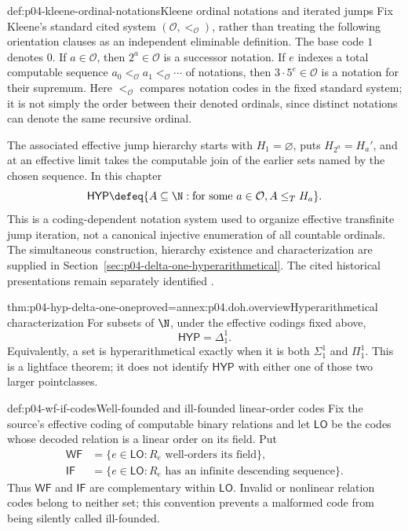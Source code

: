 \begin{hbmethod}{def:p04-kleene-ordinal-notations}{Kleene ordinal notations and iterated jumps}
Fix Kleene's standard cited system \((\mathcal O,<_{\mathcal O})\), rather
than treating the following orientation clauses as an independent eliminable
definition.  The base code \(1\) denotes \(0\).  If \(a\in\mathcal O\), then
\(2^a\in\mathcal O\) is a successor notation.  If \(e\) indexes a total
computable sequence \(a_0<_{\mathcal O}a_1<_{\mathcal O}\cdots\) of notations,
then \(3\cdot5^e\in\mathcal O\) is a notation for their supremum.
Here \(<_{\mathcal O}\) compares notation codes in the fixed standard system;
it is not simply the order between their denoted ordinals, since distinct
notations can denote the same recursive ordinal.

The associated effective jump hierarchy starts with \(H_1=\varnothing\),
puts \(H_{2^a}=H_a'\), and at an effective limit takes the computable join of
the earlier sets named by the chosen sequence.  In this chapter
\[
 \mathsf{HYP}\defeq
 \{A\subseteq\N:\text{for some }a\in\mathcal O, A\leq_T H_a\}.
\]
This is a coding-dependent notation system used to organize effective
transfinite jump iteration, not a canonical injective enumeration of all
countable ordinals. The simultaneous construction, hierarchy existence and
characterization are supplied in
Section~\ref{sec:p04-delta-one-hyperarithmetical}. The cited historical
presentations remain separately identified \cite{Kleene1955Hierarchy,
Moschovakis2016Hyperarithmetical,Rogers1967}.
\end{hbmethod}

\begin{hbtheorem}{thm:p04-hyp-delta-one-one}{proved=annex:p04.doh.overview}{Hyperarithmetical characterization}
For subsets of \(\N\), under the effective codings fixed above,
\[
 \mathsf{HYP}=\Delta^1_1.
\]
Equivalently, a set is hyperarithmetical exactly when it is both
\(\Sigma^1_1\) and \(\Pi^1_1\).  This is a lightface theorem; it does not
identify \(\mathsf{HYP}\) with either one of those two larger pointclasses.
\end{hbtheorem}



\begin{hbdefinition}{def:p04-wf-if-codes}{Well-founded and ill-founded linear-order codes}
Fix the source's effective coding of computable binary relations and let
\(\mathsf{LO}\) be the codes whose decoded relation is a linear order on its
field.  Put
\[
 \begin{aligned}
  \mathsf{WF}&=\{e\in\mathsf{LO}:R_e
       \text{ well-orders its field}\},\\
  \mathsf{IF}&=\{e\in\mathsf{LO}:R_e
       \text{ has an infinite descending sequence}\}.
 \end{aligned}
\]
Thus \(\mathsf{WF}\) and \(\mathsf{IF}\) are complementary within
\(\mathsf{LO}\).  Invalid or nonlinear relation codes belong to neither set;
this convention prevents a malformed code from being silently called
ill-founded.
\end{hbdefinition}

